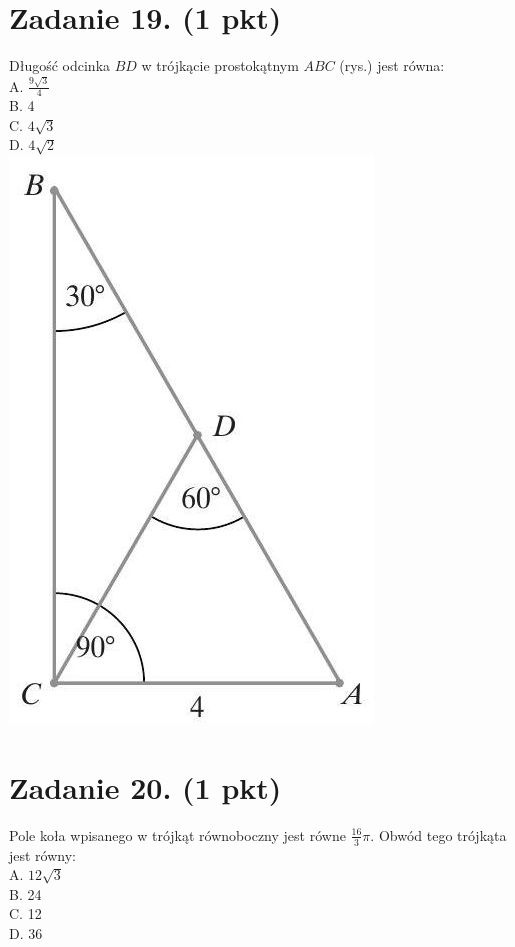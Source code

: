 \documentclass[10pt]{article}
\begin{document}
\section*{Zadanie 19. (1 pkt)}
Długość odcinka \(B D\) w trójkącie prostokątnym \(A B C\) (rys.) jest równa:\\
A. \(\frac{9 \sqrt{3}}{4}\)\\
B. 4\\
C. \(4 \sqrt{3}\)\\
D. \(4 \sqrt{2}\)\\
\includegraphics[max width=\textwidth, center]{2024_11_21_769d5953f978b92e06f5g-08}

\section*{Zadanie 20. (1 pkt)}
Pole koła wpisanego w trójkąt równoboczny jest równe \(\frac{16}{3} \pi\). Obwód tego trójkąta jest równy:\\
A. \(12 \sqrt{3}\)\\
B. 24\\
C. 12\\
D. 36
\end{document}
